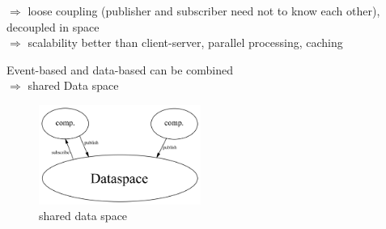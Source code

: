 \documentclass[ngerman,a4paper]{report}
\begin{document}
\begin{compactitem}
\begin{compactitem}
$\Rightarrow$ loose coupling (publisher and subscriber need not to know each other), decoupled in space\\
$\Rightarrow$ scalability better than client-server, parallel processing, caching\\
\end{compactitem}
Event-based and data-based can be combined\\
$\Rightarrow$ shared Data space \\
\begin{figure}[h]
	\centering
	\includegraphics[width=200px]{gfx/shared_data_space.png}
	\caption{shared data space}
	\label{img:shared_data_space}
\end{figure}
\end{compactitem}
\end{document}
